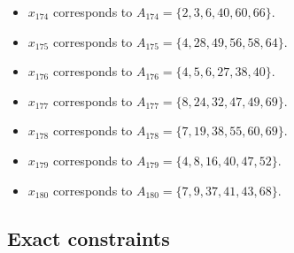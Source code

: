 \documentclass[11pt]{article}
\begin{document}
\begin{itemize}
\item $x_{174}$ corresponds to $A_{174}=\{2, 3, 6, 40, 60, 66\}$.
\item $x_{175}$ corresponds to $A_{175}=\{4, 28, 49, 56, 58, 64\}$.
\item $x_{176}$ corresponds to $A_{176}=\{4, 5, 6, 27, 38, 40\}$.
\item $x_{177}$ corresponds to $A_{177}=\{8, 24, 32, 47, 49, 69\}$.
\item $x_{178}$ corresponds to $A_{178}=\{7, 19, 38, 55, 60, 69\}$.
\item $x_{179}$ corresponds to $A_{179}=\{4, 8, 16, 40, 47, 52\}$.
\item $x_{180}$ corresponds to $A_{180}=\{7, 9, 37, 41, 43, 68\}$.
\end{itemize}
\subsection*{Exact constraints}
\end{document}
